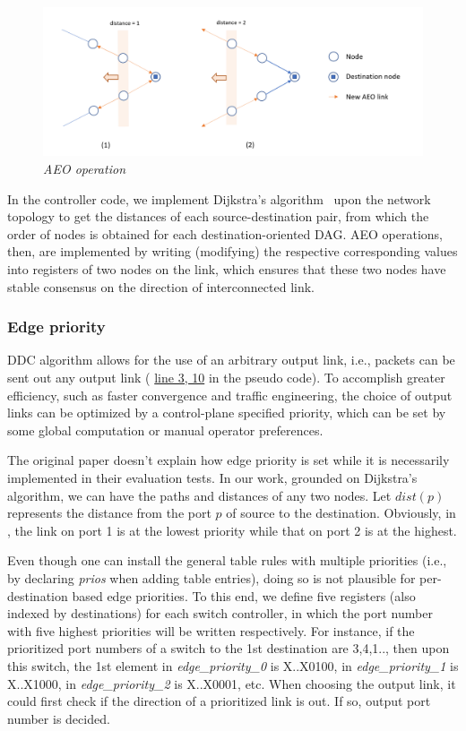 \begin{figure}[H]
      \centering \includegraphics[scale=0.36]{pictures/AEO.png}
      \caption{\it{AEO operation}}
      \label{fig:AEO}
\end{figure}

In the controller code, we implement Dijkstra's algorithm~\cite{dijkstra1959note} upon the network topology to get the distances of each source-destination pair, from which the order of nodes is obtained for each destination-oriented DAG. AEO operations, then, are implemented by writing (modifying) the respective corresponding values into \ld registers of two nodes on the link, which ensures that these two nodes have stable consensus on the direction of interconnected link.  

\subsubsection{Edge priority}

DDC algorithm allows for the use of an arbitrary output link, i.e., packets can be sent out any output link ( \hyperref[algo:DDC]{line 3, 10} in the pseudo code). To accomplish greater efficiency, such as faster convergence and traffic engineering, the choice of output links can be optimized by a control-plane specified priority, which can be set by some global computation or manual operator preferences. 

The original paper doesn't explain how edge priority is set while it is necessarily implemented in their evaluation tests. In our work, grounded on Dijkstra's algorithm, we can have the paths and distances of any two nodes. Let $dist(p)$ represents the distance from the port $p$ of source to the destination. Obviously, in , the link on port 1 is at the lowest priority while that on port 2 is at the highest. 

Even though one can install the general table rules with multiple priorities (i.e., by declaring \textit{prios} when adding table entries), doing so is not plausible for per-destination based edge priorities. To this end, we define five registers (also indexed by destinations) for each switch controller, in which the port number with five highest priorities will be written respectively. For instance, if the prioritized port numbers of a switch to the 1st destination are 3,4,1.., then upon this switch, the 1st element in \textit{edge\_priority\_0} is X..X0100, in \textit{edge\_priority\_1} is X..X1000, in \textit{edge\_priority\_2} is X..X0001, etc. When choosing the output link, it could first check if the direction of a prioritized link is out. If so, output port number is decided. 

